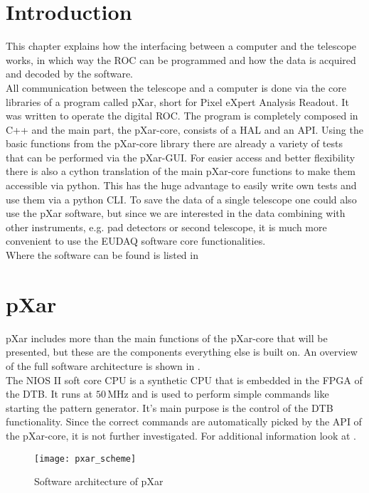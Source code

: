 \section{Introduction}
This chapter explains how the interfacing between a computer and the telescope works, in which way the \ac{ROC} can be programmed and how the data is acquired and decoded by the software.\\
All communication between the telescope and a computer is done via the core libraries of a program called pXar, short for Pixel eXpert Analysis Readout. It was written to operate the digital \ac{ROC}. The program is completely composed in C++ and the main part, the pXar-core, consists of a \ac{HAL} and an \ac{API}. Using the basic functions from the pXar-core library there are already a variety of tests that can be performed via the pXar-\ac{GUI}. For easier access and better flexibility there is also a cython translation of the main pXar-core functions to make them accessible via python. This has the huge advantage to easily write own tests and use them via a python \ac{CLI}. To save the data of a single telescope one could also use the pXar software, but since we are interested in the data combining with other instruments, e.g. pad detectors or second telescope, it is much more convenient to use the EUDAQ software core functionalities.\\
Where the software can be found is listed in 
\section{pXar}
pXar includes more than the main functions of the pXar-core that will be presented, but these are the components everything else is built on. An overview of the full software architecture is shown in .\\
The NIOS II soft core \ac{CPU} is a synthetic \ac{CPU} that is embedded in the \ac{FPGA} of the \ac{DTB}. It runs at $50\,$MHz and is used to perform simple commands like starting the pattern generator. It's main purpose is the control of the \ac{DTB} functionality. Since the correct commands are automatically picked by the \ac{API} of the pXar-core, it is not further investigated. For additional information look at \cite{spannagel}.
\begin{figure}[ht]
	\texttt{[image: pxar\_scheme]}
	\caption{Software architecture of pXar \cite{spannagel}}
	\label{p13}
\end{figure}
